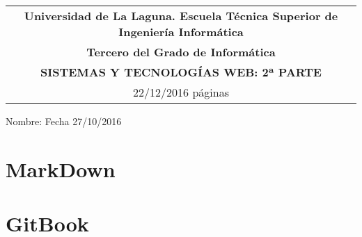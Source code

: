 \documentclass[]{article}
\date{}
\begin{document}
\thispagestyle{empty}
  \begin{tabular}{c}
   {\bf Universidad de La Laguna.  Escuela Técnica Superior de Ingeniería Informática}     \\
   {\bf Tercero del Grado de Informática}\\
   {\bf SISTEMAS Y TECNOLOGÍAS WEB: 2ª PARTE}\\
   22/12/2016  \pageref*{LastPage} páginas         \\   
  \end{tabular}                     %

\bigskip

Nombre:  \underline{\hspace{11.5cm}} Fecha 27/10/2016\underline{\hspace{2cm}} 
\bigskip





\section{MarkDown}


\section{GitBook}

\end{document}
